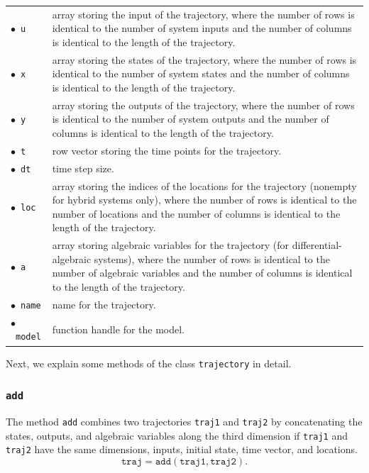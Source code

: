\begin{center}
\renewcommand{\arraystretch}{1.3}
\begin{tabular}[t]{l p{13cm} }
	$\bullet$~\texttt{u} & array storing the input of the trajectory, where the number of rows is identical to the number of
	system inputs and the number of columns is identical to the length of the trajectory.\\
	$\bullet$~\texttt{x} & array storing the states of the trajectory, where the number of rows is identical to the number of
	system states and the number of columns is identical to the length of the trajectory.\\
	$\bullet$~\texttt{y} & array storing the outputs of the trajectory, where the number of rows is identical to the number of
	system outputs and the number of columns is identical to the length of the trajectory.\\
	$\bullet$~\texttt{t} & row vector storing the time points for the trajectory. \\
	$\bullet$~\texttt{dt} & time step size.\\
	$\bullet$~\texttt{loc} & array storing the indices of the locations for the trajectory (nonempty for hybrid systems only), where the number of rows is identical to the number of
	locations and the number of columns is identical to the length of the trajectory.\\
	$\bullet$~\texttt{a} & array storing algebraic variables for the trajectory (for differential-algebraic systems), where the number of rows is identical to the number of
	algebraic variables and the number of columns is identical to the length of the trajectory. \\
	$\bullet$~\texttt{name} & name for the trajectory. \\
	$\bullet$~\texttt{model} & function handle for the model. \\
\end{tabular}
\end{center}

Next, we explain some methods of the class \texttt{trajectory} in detail.

\subsubsection{\texttt{add}}

The method \texttt{add} combines two trajectories \texttt{traj1} and \texttt{traj2} by concatenating the states, outputs, and algebraic variables along the third dimension if \texttt{traj1} and \texttt{traj2} have the same dimensions, inputs, initial state, time vector, and locations.
\begin{equation*}
	\texttt{traj} = \texttt{add}(\texttt{traj1},\texttt{traj2}).
\end{equation*}


